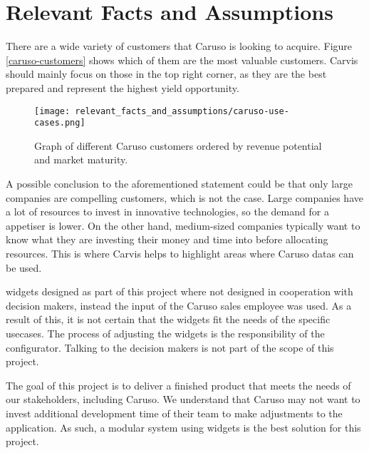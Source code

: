 \chapter{Relevant Facts and Assumptions}

There are a wide variety of customers that Caruso is looking to acquire. Figure \autoref{caruso-customers} shows which of them are the most valuable customers. Carvis should mainly focus on those in the top right corner, as they are the best prepared and represent the highest yield opportunity.

\begin{figure}[ht]
  \centering
  \texttt{[image: relevant\_facts\_and\_assumptions/caruso-use-cases.png]}
  \caption{Graph of different Caruso customers ordered by revenue potential and market maturity.}
  \label{caruso-customers}
\end{figure}

A possible conclusion to the aforementioned statement could be that only large companies are compelling customers, which is not the case. Large companies have a lot of resources to invest in innovative technologies, so the demand for a \gls{appetiser} is lower. On the other hand, medium-sized companies typically want to know what they are investing their money and time into before allocating resources. This is where Carvis helps to highlight areas where Caruso \glspl{data} can be used.

\Glspl{widget} designed as part of this project where not designed in cooperation with decision makers, instead the input of the Caruso sales employee was used. As a result of this, it is not certain that the \glspl{widget} fit the needs of the specific \glspl{usecase}. The process of adjusting the \glspl{widget} is the responsibility of the configurator. Talking to the decision makers is not part of the scope of this project.

The goal of this project is to deliver a finished product that meets the needs of our \glspl{stakeholder}, including Caruso. We understand that Caruso may not want to invest additional development time of their team to make adjustments to the application. As such, a modular system using \glspl{widget} is the best solution for this project.